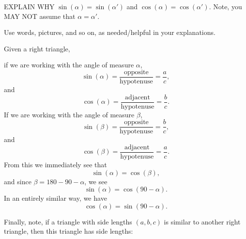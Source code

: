 \documentclass[handout,noauthor,nooutcomes,12pt,hints]{ximera}
\begin{document}
\begin{question}
\begin{enumerate}
\begin{center}
    \end{center}
      EXPLAIN WHY $\sin(\alpha) = \sin(\alpha')$ and $\cos(\alpha) =
      \cos(\alpha')$. Note, you MAY NOT assume that $\alpha =
      \alpha'$.
  \end{enumerate}
  Use words, pictures, and so on, as needed/helpful in your
  explanations.
  \begin{freeResponse}
    Given a right triangle,
    \begin{center}
    \end{center}
    if we are working with the angle of measure $\alpha$,
    \[
    \sin(\alpha) = \frac{\text{opposite}}{\text{hypotenuse}} = \frac{a}{c},
    \]
    and
    \[
    \cos(\alpha) = \frac{\text{adjacent}}{\text{hypotenuse}} = \frac{b}{c}.
    \]
    If we are working with the angle of measure $\beta$,
    \[
    \sin(\beta) = \frac{\text{opposite}}{\text{hypotenuse}} = \frac{b}{c},
    \]
    and
    \[
    \cos(\beta) = \frac{\text{adjacent}}{\text{hypotenuse}} = \frac{a}{c}.
    \]
    From this we immediately see that
    \[
    \sin(\alpha) = \cos(\beta),
    \]
    and since $\beta = 180-90-\alpha$, we see
    \[
    \sin(\alpha) = \cos(90-\alpha).
    \]
    In an entirely similar way, we have
    \[
    \cos(\alpha) = \sin(90-\alpha).
    \]

    Finally, note, if a triangle with side lengths $(a,b,c)$ is
    similar to another right triangle, then this triangle has side
    lengths:
          \begin{center}
\end{center}
\end{freeResponse}
\end{question}
\end{document}
